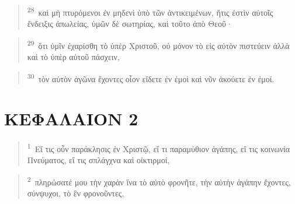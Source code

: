 \documentclass{article}
\newcommand{\currentverse}{1} %
\newcommand{\setcurrentverse}[1]{\renewcommand{\currentverse}{#1}}
\begin{document}
\begin{verse}

\setcurrentverse{28}

\setcounter{footnote}{0}

\textsuperscript{28}~καὶ μὴ πτυρόμενοι ἐν μηδενὶ ὑπὸ τῶν ἀντικειμένων, ἥτις ἐστὶν αὐτοῖς ἔνδειξις ἀπωλείας, ὑμῶν δὲ σωτηρίας, καὶ τοῦτο ἀπὸ Θεοῦ·

\end{verse}

\begin{verse}

\setcurrentverse{29}

\setcounter{footnote}{0}

\textsuperscript{29}~ὅτι ὑμῖν ἐχαρίσθη τὸ ὑπὲρ Χριστοῦ, οὐ μόνον τὸ εἰς αὐτὸν πιστεύειν ἀλλὰ καὶ τὸ ὑπὲρ αὐτοῦ πάσχειν,

\end{verse}

\begin{verse}

\setcurrentverse{30}

\setcounter{footnote}{0}

\textsuperscript{30}~τὸν αὐτὸν ἀγῶνα ἔχοντες οἷον εἴδετε ἐν ἐμοὶ καὶ νῦν ἀκούετε ἐν ἐμοί.

\end{verse}

\section*{ΚΕΦΑΛΑΙΟΝ 2}

\begin{verse}

\setcurrentverse{1}

\setcounter{footnote}{0}

\textsuperscript{1}~Εἴ τις οὖν παράκλησις ἐν Χριστῷ, εἴ τι παραμύθιον ἀγάπης, εἴ τις κοινωνία Πνεύματος, εἴ τις σπλάγχνα καὶ οἰκτιρμοί,

\end{verse}

\begin{verse}

\setcurrentverse{2}

\setcounter{footnote}{0}

\textsuperscript{2}~πληρώσατέ μου τὴν χαρὰν ἵνα τὸ αὐτὸ φρονῆτε, τὴν αὐτὴν ἀγάπην ἔχοντες, σύνψυχοι, τὸ ἓν φρονοῦντες,

\end{verse}
\end{document}
